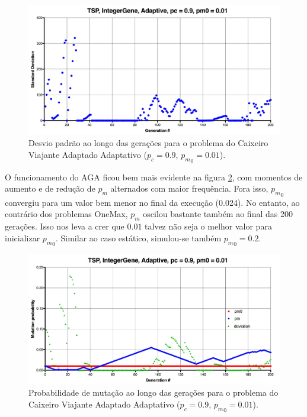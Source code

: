 \begin{figure}[ht!]
    \centering \includegraphics[width=1.0\textwidth]{tsp_001_adaptive_std.jpg}
    \caption{Desvio padrão ao longo das gerações para o problema do Caixeiro Viajante Adaptado Adaptativo ($p_c=0.9$, ${p_m}_0=0.01$).}
    \label{fig:tsp_001_adaptive_std}
\end{figure}

O funcionamento do AGA ficou bem mais evidente na figura \ref{fig:tsp_001_adaptive_pm}, com momentos de aumento e de redução de $p_m$ alternados com maior frequência. Fora isso, ${p_m}_0$ convergiu para um valor bem menor no final da execução (0.024). No entanto, ao contrário dos problemas OneMax, $p_m$ oscilou bastante também ao final das 200 gerações. Isso nos leva a crer que $0.01$ talvez não seja o melhor valor para inicializar ${p_m}_0$. Similar ao caso estático, simulou-se também ${p_m}_0 = 0.2$.

\begin{figure}[ht!]
    \centering \includegraphics[width=1.0\textwidth]{tsp_001_adaptive_pm.jpg}
    \caption{Probabilidade de mutação ao longo das gerações para o problema do Caixeiro Viajante Adaptado Adaptativo ($p_c=0.9$, ${p_m}_0=0.01$).}
    \label{fig:tsp_001_adaptive_pm}
\end{figure}


